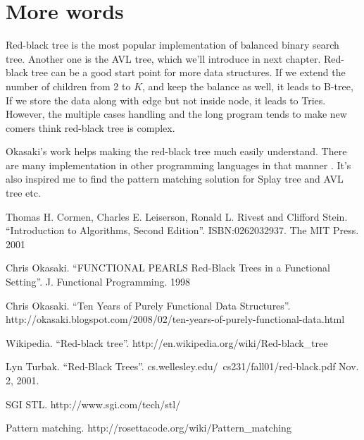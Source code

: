 \documentclass{article}
\begin{document}
\section{More words}
Red-black tree is the most popular implementation of balanced binary search
tree. Another one is the AVL tree, which we'll introduce in next chapter. 
Red-black tree can be a good start point for more data structures. If we
extend the number of children from 2 to $K$, and keep the balance as well,
it leads to B-tree, If we store the data along with edge but not inside
node, it leads to Tries. However, the multiple cases handling and the long 
program tends to make new comers think red-black tree is complex.

Okasaki's work helps making the red-black tree much easily understand.
There are many implementation in other programming languages in that 
manner \cite{rosetta}. It's also inspired me to find the pattern matching
solution for Splay tree and AVL tree etc.

\begin{thebibliography}{99}

Thomas H. Cormen, Charles E. Leiserson, Ronald L. Rivest and Clifford Stein. 
``Introduction to Algorithms, Second Edition''. ISBN:0262032937. The MIT Press. 2001

Chris Okasaki. ``FUNCTIONAL PEARLS Red-Black Trees in a Functional Setting''. J. Functional Programming. 1998

Chris Okasaki. ``Ten Years of Purely Functional Data Structures''. http://okasaki.blogspot.com/2008/02/ten-years-of-purely-functional-data.html

Wikipedia. ``Red-black tree''. http://en.wikipedia.org/wiki/Red-black\_tree

Lyn Turbak. ``Red-Black Trees''. cs.wellesley.edu/~cs231/fall01/red-black.pdf Nov. 2, 2001.

SGI STL. http://www.sgi.com/tech/stl/

Pattern matching. http://rosettacode.org/wiki/Pattern\_matching

\end{thebibliography}

\ifx\wholebook\relax\else
\end{document}
